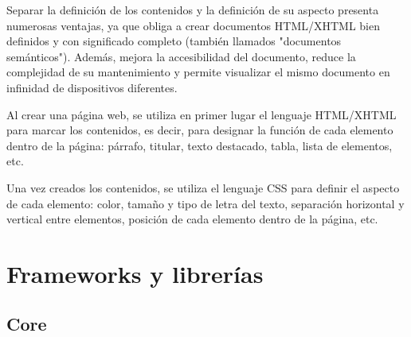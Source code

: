 \documentclass[12pt, a4paper, twoside]{book}
\begin{document}
	Separar la definición de los contenidos y la definición de su aspecto presenta numerosas ventajas, ya que obliga a crear documentos HTML/XHTML bien definidos y con significado completo (también llamados "documentos semánticos"). Además, mejora la accesibilidad del documento, reduce la complejidad de su mantenimiento y permite visualizar el mismo documento en infinidad de dispositivos diferentes.
	
	Al crear una página web, se utiliza en primer lugar el lenguaje HTML/XHTML para marcar los contenidos, es decir, para designar la función de cada elemento dentro de la página: párrafo, titular, texto destacado, tabla, lista de elementos, etc.
	
	Una vez creados los contenidos, se utiliza el lenguaje CSS para definir el aspecto de cada elemento: color, tamaño y tipo de letra del texto, separación horizontal y vertical entre elementos, posición de cada elemento dentro de la página, etc.\cite{CSS}
	\section{Frameworks y librerías}
	\subsection{Core}
\end{document}
